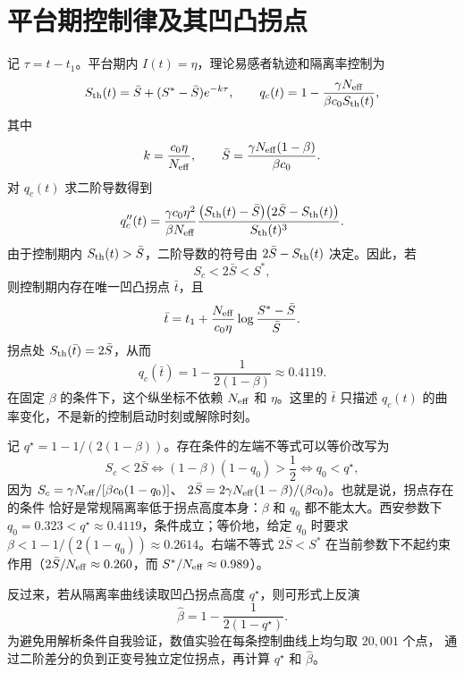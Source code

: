 \documentclass[UTF8]{ctexart}
\begin{document}
\clearpage
\section{平台期控制律及其凹凸拐点}
记 $\tau=t-t_1$。平台期内 $I(t)=\eta$，理论易感者轨迹和隔离率控制为
\[
S_{\rm th}(t)=\bar S+(S^*-\bar S)e^{-k\tau},\qquad
q_c(t)=1-\frac{\gamma N_{\rm eff}}{\beta c_0S_{\rm th}(t)},
\]
其中
\[
k=\frac{c_0\eta}{N_{\rm eff}},\qquad
\bar S=\frac{\gamma N_{\rm eff}(1-\beta)}{\beta c_0}.
\]
对 $q_c(t)$ 求二阶导数得到
\[
q_c''(t)
=
\frac{\gamma c_0\eta^2}{\beta N_{\rm eff}}
\frac{\bigl(S_{\rm th}(t)-\bar S\bigr)
\bigl(2\bar S-S_{\rm th}(t)\bigr)}{S_{\rm th}(t)^3}.
\]
由于控制期内 $S_{\rm th}(t)>\bar S$，二阶导数的符号由
$2\bar S-S_{\rm th}(t)$ 决定。因此，若
\[
S_c<2\bar S<S^*,
\]
则控制期内存在唯一凹凸拐点 $\bar t$，且
\[
\bar t
=t_1+\frac{N_{\rm eff}}{c_0\eta}
\log\frac{S^*-\bar S}{\bar S}.
\]
拐点处 $S_{\rm th}(\bar t)=2\bar S$，从而
\[
q_c(\bar t)
=1-\frac{1}{2(1-\beta)}
\approx 0.4119.
\]
在固定 $\beta$ 的条件下，这个纵坐标不依赖 $N_{\rm eff}$ 和 $\eta$。这里的
$\bar t$ 只描述 $q_c(t)$ 的曲率变化，不是新的控制启动时刻或解除时刻。

记 $q^\star=1-1/(2(1-\beta))$。存在条件的左端不等式可以等价改写为
\[
S_c<2\bar S
\iff
(1-\beta)(1-q_0)>\frac{1}{2}
\iff
q_0<q^\star,
\]
因为 $S_c=\gamma N_{\rm eff}/[\beta c_0(1-q_0)]$、
$2\bar S=2\gamma N_{\rm eff}(1-\beta)/(\beta c_0)$。也就是说，拐点存在的条件
恰好是常规隔离率低于拐点高度本身：$\beta$ 和 $q_0$ 都不能太大。西安参数下
$q_0=0.323<q^\star\approx0.4119$，条件成立；等价地，给定
$q_0$ 时要求 $\beta<1-1/(2(1-q_0))\approx0.2614$。右端不等式
$2\bar S<S^*$ 在当前参数下不起约束作用（$2\bar S/N_{\rm eff}\approx
0.260$，而 $S^*/N_{\rm eff}\approx0.989$）。

反过来，若从隔离率曲线读取凹凸拐点高度 $q^\star$，则可形式上反演
\[
\widehat\beta
=1-\frac{1}{2(1-q^\star)}.
\]
为避免用解析条件自我验证，数值实验在每条控制曲线上均匀取 $20,001$ 个点，
通过二阶差分的负到正变号独立定位拐点，再计算 $q^\star$ 和 $\widehat\beta$。

\noindent{}
\end{document}
